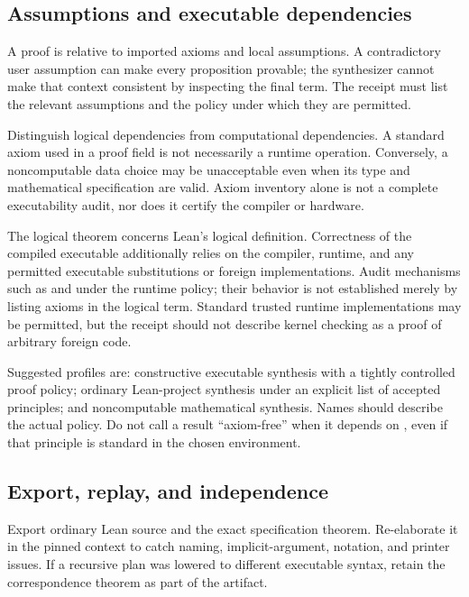 \documentclass[11pt,letterpaper]{article}
\newcommand{\code}[1]{\texttt{\detokenize{#1}}}
\theoremstyle{definition}
\theoremstyle{remark}
\begin{document}
\subsection{Assumptions and executable dependencies}

A proof is relative to imported axioms and local assumptions. A contradictory user assumption can make every proposition provable; the synthesizer cannot make that context consistent by inspecting the final term. The receipt must list the relevant assumptions and the policy under which they are permitted.

Distinguish logical dependencies from computational dependencies. A standard axiom used in a proof field is not necessarily a runtime operation. Conversely, a noncomputable data choice may be unacceptable even when its type and mathematical specification are valid. Axiom inventory alone is not a complete executability audit, nor does it certify the compiler or hardware.

The logical theorem concerns Lean's logical definition. Correctness of the compiled executable additionally relies on the compiler, runtime, and any permitted executable substitutions or foreign implementations. Audit mechanisms such as \code{implemented_by} and \code{extern} under the runtime policy; their behavior is not established merely by listing axioms in the logical term. Standard trusted runtime implementations may be permitted, but the receipt should not describe kernel checking as a proof of arbitrary foreign code.

Suggested profiles are: constructive executable synthesis with a tightly controlled proof policy; ordinary Lean-project synthesis under an explicit list of accepted principles; and noncomputable mathematical synthesis. Names should describe the actual policy. Do not call a result ``axiom-free'' when it depends on \code{propext}, even if that principle is standard in the chosen environment.

\subsection{Export, replay, and independence}

Export ordinary Lean source and the exact specification theorem. Re-elaborate it in the pinned context to catch naming, implicit-argument, notation, and printer issues. If a recursive plan was lowered to different executable syntax, retain the correspondence theorem as part of the artifact.
\end{document}
